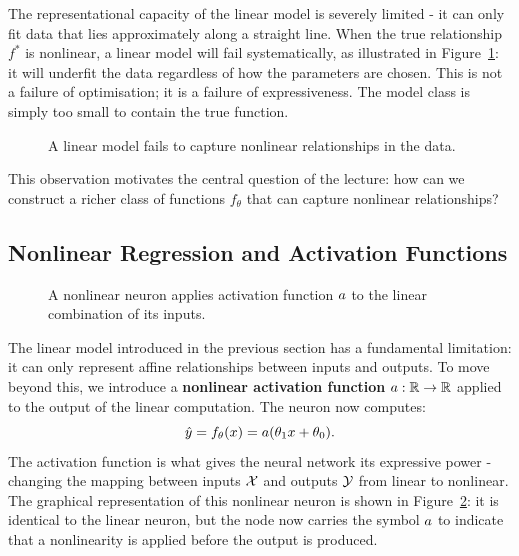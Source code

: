 The representational capacity of the linear model is severely limited - it can only fit data that lies approximately along a straight line. When the true relationship $f^*$ is nonlinear, a linear model will fail systematically, as illustrated in Figure~\ref{fig:regression_nonlinear}: it will underfit the data regardless of how the parameters are chosen. This is not a failure of optimisation; it is a failure of expressiveness. The model class is simply too small to contain the true function.

\begin{figure}[h]
 \centering
 \begin{minipage}{0.5\textwidth}
 \centering
 \resizebox{\textwidth}{!}{}
 \caption{A linear model fits the data well when the true relationship is linear.}
 \label{fig:regression_linear}
 \end{minipage}
 \hfill
 \begin{minipage}{0.43\textwidth}
 \centering
 \resizebox{\textwidth}{!}{}
 \caption{A linear model fails to capture nonlinear relationships in the data.}
 \label{fig:regression_nonlinear}
 \end{minipage}
\end{figure}

This observation motivates the central question of the lecture: how can we construct a richer class of functions $f_\theta$ that can capture nonlinear relationships?

\subsection{Nonlinear Regression and Activation Functions}

\begin{figure}
 \centering
 \resizebox{0.25\textwidth}{!}{}
 \caption{A nonlinear neuron applies activation function $a$ to the linear combination of its inputs.}
 \label{fig:relu_neuron}
\end{figure}
The linear model introduced in the previous section has a fundamental limitation: it can only represent affine relationships between inputs and outputs. To move beyond this, we introduce a \textbf{nonlinear activation function} $a: \mathbb{R} \to \mathbb{R}$ applied to the output of the linear computation. The neuron now computes:
\begin{equation}
 \hat{y} = f_\theta(x) = a(\theta_1 x + \theta_0).
\end{equation}
The activation function is what gives the neural network its expressive power -changing the mapping between inputs $\mathcal{X}$ and outputs $\mathcal{Y}$ from linear to nonlinear. The graphical representation of this nonlinear neuron is shown in Figure~\ref{fig:relu_neuron}: it is identical to the linear neuron, but the node now carries the symbol $a$ to indicate that a nonlinearity is applied before the output is produced.

